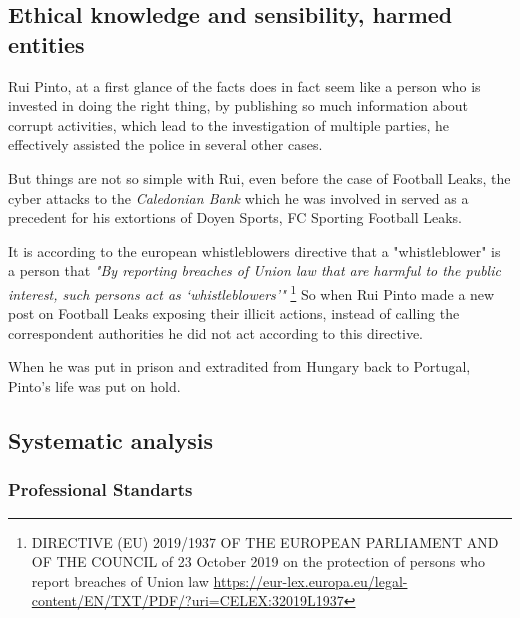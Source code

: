 \subsection{Ethical knowledge and sensibility, harmed entities}
Rui Pinto, at a first glance of the facts does in fact seem like a person who is invested in doing the right thing, by publishing so much information about corrupt activities, which lead to the investigation of multiple parties, he effectively assisted the police in several other cases.

But things are not so simple with Rui, even before the case of Football Leaks, the cyber attacks to the \textit{Caledonian Bank} which he was involved in served as a precedent for his extortions of Doyen Sports, FC Sporting  Football Leaks.

It is according to the european whistleblowers directive that a "whistleblower" is a person that \textit{"By reporting breaches of Union law that are harmful to the public interest, such persons act as ‘whistleblowers’"}
\footnote{DIRECTIVE (EU) 2019/1937 OF THE EUROPEAN PARLIAMENT AND OF THE COUNCIL of 23 October 2019 on the protection of persons who report breaches of Union law \url{https://eur-lex.europa.eu/legal-content/EN/TXT/PDF/?uri=CELEX:32019L1937}}
So when Rui Pinto made a new post on Football Leaks exposing their illicit actions, instead of calling the correspondent authorities he did not act according to this directive.

When he was put in prison and extradited from Hungary back to Portugal, Pinto's life was put on hold.



\subsection{Systematic analysis}
\subsubsection{Professional Standarts}
